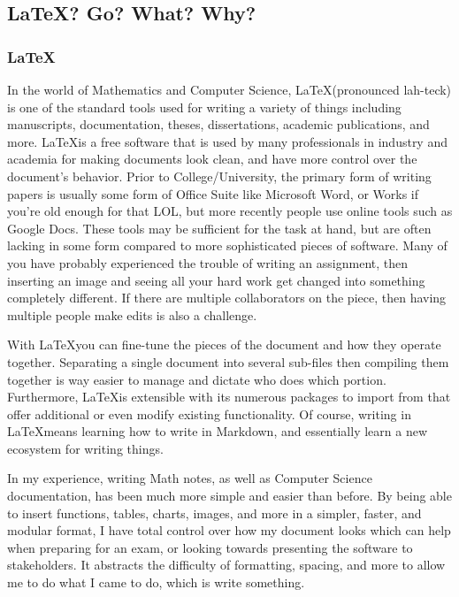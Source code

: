 \subsection{\LaTeX? Go? What? Why?}

\subsubsection{\LaTeX}

In the world of Mathematics and Computer Science, \LaTeX (pronounced
lah-teck) is one of
the standard tools used for writing a variety of things including
manuscripts, documentation, theses, dissertations, academic
publications, and more.
\LaTeX is a free software that is used by
many professionals in industry and academia for making documents look
clean, and have more control over the document's behavior.
Prior to College/University, the primary form of writing papers is
usually some form of Office Suite like Microsoft Word, or Works if
you're old enough for that LOL, but more recently people use online
tools such as Google Docs.
These tools may be sufficient for the task at hand, but are often
lacking in some form compared to more sophisticated pieces of software.
Many of you have probably experienced the trouble of writing an
assignment, then inserting an image and seeing all your hard work get
changed into something completely different.
If there are multiple collaborators on the piece, then having
multiple people make edits is also a challenge.

With \LaTeX you can fine-tune the pieces of the document and how they
operate together.
Separating a single document into several sub-files then compiling
them together is way easier to manage and dictate who does which portion.
Furthermore, \LaTeX is extensible with its numerous packages to
import from that offer additional or even modify existing functionality.
Of course, writing in \LaTeX means learning how to write in Markdown,
and essentially learn a new ecosystem for writing things.

In my experience, writing Math notes, as well as Computer Science
documentation, has been much more simple and easier than before.
By being able to insert functions, tables, charts, images, and more
in a simpler, faster, and modular format, I have total control over how my
document looks which can help when preparing for an exam, or looking
towards presenting the software to stakeholders. It abstracts the
difficulty of formatting, spacing, and more to allow me to do what I
came to do, which is write something.

